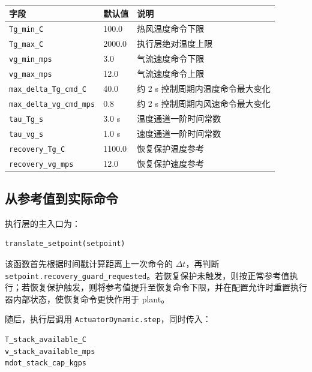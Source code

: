 \documentclass[UTF8,openany,zihao=-4,oneside]{ctexbook}
\providecommand{\passthrough}[1]{#1}
\begin{document}
\begin{longtable}[c]{@{}p{}p{}p{}@{}}
\toprule\noalign{}
字段 & 默认值 & 说明 \\
\midrule\noalign{}
\endhead
\bottomrule\noalign{}
\endlastfoot
\passthrough{\lstinline!Tg_min_C!} & 100.0 & 热风温度命令下限 \\
\passthrough{\lstinline!Tg_max_C!} & 2000.0 & 执行层绝对温度上限 \\
\passthrough{\lstinline!vg_min_mps!} & 3.0 & 气流速度命令下限 \\
\passthrough{\lstinline!vg_max_mps!} & 12.0 & 气流速度命令上限 \\
\passthrough{\lstinline!max_delta_Tg_cmd_C!} & 40.0 & 约 2 s 控制周期内温度命令最大变化 \\
\passthrough{\lstinline!max_delta_vg_cmd_mps!} & 0.8 & 约 2 s 控制周期内风速命令最大变化 \\
\passthrough{\lstinline!tau_Tg_s!} & 3.0 s & 温度通道一阶时间常数 \\
\passthrough{\lstinline!tau_vg_s!} & 1.0 s & 速度通道一阶时间常数 \\
\passthrough{\lstinline!recovery_Tg_C!} & 1100.0 & 恢复保护温度参考 \\
\passthrough{\lstinline!recovery_vg_mps!} & 12.0 & 恢复保护速度参考 \\
\end{longtable}

\subsection{从参考值到实际命令}\label{subsec:ref-to-cmd-implementation}

执行层的主入口为：

\begin{lstlisting}
translate_setpoint(setpoint)
\end{lstlisting}

该函数首先根据时间戳计算距离上一次命令的 \(\Delta t\)，再判断 \passthrough{\lstinline!setpoint.recovery_guard_requested!}。若恢复保护未触发，则按正常参考值执行；若恢复保护触发，则将参考值提升至恢复命令下限，并在配置允许时重置执行器内部状态，使恢复命令更快作用于 plant。

随后，执行层调用 \passthrough{\lstinline!ActuatorDynamic.step!}，同时传入：

\begin{lstlisting}
T_stack_available_C
v_stack_available_mps
mdot_stack_cap_kgps
\end{lstlisting}
\end{document}
